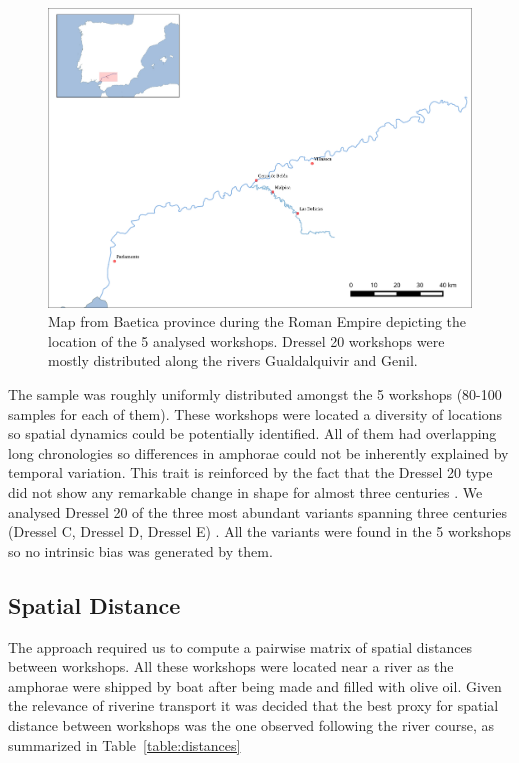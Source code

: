 \documentclass[review]{elsarticle}
\begin{document}
\begin{figure}[htp]
	\centering
\includegraphics[width=\linewidth]{figs/romanworkshop}
\caption{Map from Baetica province during the Roman Empire depicting the location of the 5 analysed workshops. Dressel 20 workshops were mostly distributed along the rivers Gualdalquivir and Genil.}
\label{romanworkshop}
\end{figure} 

The sample was roughly uniformly distributed amongst the 5 workshops (80-100 samples for each of them). These workshops were located a diversity of locations so spatial dynamics could be potentially identified. All of them had overlapping long chronologies so differences in amphorae could not be inherently explained by temporal variation. This trait is reinforced by the fact that the Dressel 20 type did not show any remarkable change in shape for almost three centuries \citep{berni_dressel_2016}. 
We analysed Dressel 20 of the three most abundant variants spanning three centuries (Dressel C, Dressel D, Dressel E) \citep{berni_millet_epigrafianforica_2008,martin-kilcher_romischen_1994}. All the variants were found in the 5 workshops so no intrinsic bias was generated by them.

\subsection{Spatial Distance}

The approach required us to compute a pairwise matrix of spatial distances between workshops. All these workshops were located near a river as the amphorae were shipped by boat after being made and filled with olive oil. Given the relevance of riverine transport it was decided that the best proxy for spatial distance between workshops was the one observed following the river course, as summarized in Table~\ref{table:distances}
\end{document}
